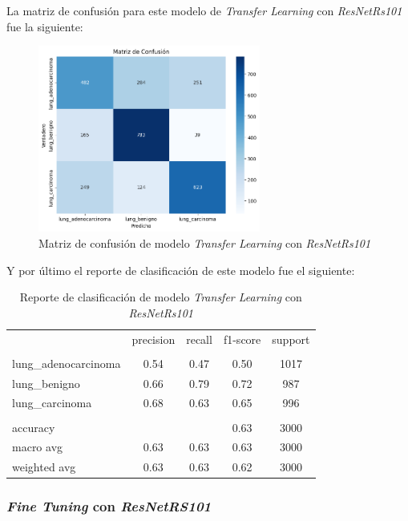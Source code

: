 La matriz de confusión para este modelo de \textit{Transfer Learning} con \textit{ResNetRs101} fue la siguiente:

\begin{figure}[H]
    \centering
    \includegraphics[width=0.65\textwidth]{Francisco/Imagenes resultados/CMCNN3.png} 
    \caption{Matriz de confusión de modelo \textit{Transfer Learning} con \textit{ResNetRs101}}
\end{figure}

\newpage

Y por último el reporte de clasificación de este modelo fue el siguiente:

\begin{table}[H]
    \centering
    \begin{tabular}{l c c c c}

         & precision & recall & f1-score & support \\
        \\
        lung\_adenocarcinoma & 0.54 & 0.47 & 0.50 & 1017 \\
        lung\_benigno & 0.66 & 0.79 & 0.72 & 987 \\
        lung\_carcinoma & 0.68 & 0.63 & 0.65 & 996 \\
        \\
        accuracy &  &  & 0.63 & 3000 \\
        macro avg & 0.63 & 0.63 & 0.63 & 3000 \\
        weighted avg & 0.63 & 0.63 & 0.62 & 3000
    
    \end{tabular}
    \caption{Reporte de clasificación de modelo \textit{Transfer Learning} con \textit{ResNetRs101}}
\end{table}

\subsubsection{\textit{Fine Tuning} con \textit{ResNetRS101}}

